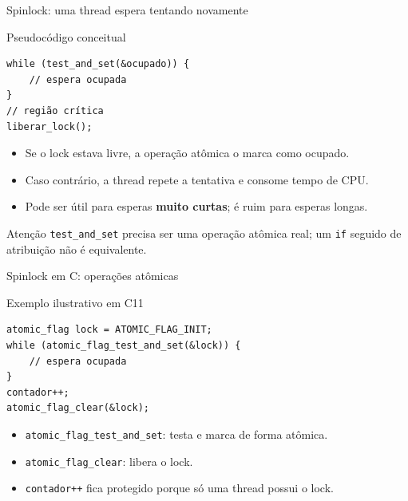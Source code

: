 \documentclass[aspectratio=169,11pt]{beamer}
\begin{document}
\begin{frame}[fragile]{Spinlock: uma thread espera tentando novamente}
\small
\begin{block}{Pseudocódigo conceitual}
\begin{verbatim}
while (test_and_set(&ocupado)) {
    // espera ocupada
}
// região crítica
liberar_lock();
\end{verbatim}
\end{block}
\begin{itemize}
\item Se o lock estava livre, a operação atômica o marca como ocupado.
\item Caso contrário, a thread repete a tentativa e consome tempo de CPU.
\item Pode ser útil para esperas \textbf{muito curtas}; é ruim para esperas longas.
\end{itemize}
\begin{alertblock}{Atenção}
\texttt{test\_and\_set} precisa ser uma operação atômica real; um \texttt{if} seguido de atribuição não é equivalente.
\end{alertblock}
\end{frame}

\begin{frame}[fragile]{Spinlock em C: operações atômicas}
\small
\begin{block}{Exemplo ilustrativo em C11}
\begin{verbatim}
atomic_flag lock = ATOMIC_FLAG_INIT;
while (atomic_flag_test_and_set(&lock)) {
    // espera ocupada
}
contador++;
atomic_flag_clear(&lock);
\end{verbatim}
\end{block}
\begin{itemize}
\item \texttt{atomic\_flag\_test\_and\_set}: testa e marca de forma atômica.
\item \texttt{atomic\_flag\_clear}: libera o lock.
\item \texttt{contador++} fica protegido porque só uma thread possui o lock.
\end{itemize}
\end{frame}
\end{document}
